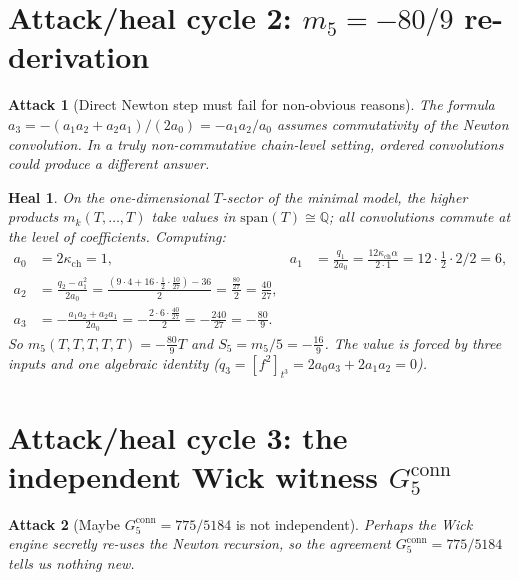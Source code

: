 \documentclass[11pt]{article}
\newtheorem{attack}{Attack}
\newtheorem*{heal}{Heal}
\newcommand{\kch}{\kappa_{\mathrm{ch}}}
\newcommand{\conn}{\mathrm{conn}}
\begin{document}
\section{Attack/heal cycle 2: $m_5=-80/9$ re-derivation}

\begin{attack}[Direct Newton step must fail for non-obvious reasons]
The formula $a_3=-(a_1a_2+a_2a_1)/(2a_0)=-a_1a_2/a_0$ assumes
commutativity of the Newton convolution. In a truly non-commutative
chain-level setting, ordered convolutions could produce a different
answer.
\end{attack}

\begin{heal}
On the one-dimensional $T$-sector of the minimal model, the
higher products $m_k(T,\ldots,T)$ take values in
$\mathrm{span}(T)\cong\mathbb{Q}$; all convolutions commute at the
level of coefficients. Computing:
\begin{align*}
a_0 &= 2\kch = 1,
&a_1&= \frac{q_1}{2a_0} = \frac{12\kch\alpha}{2\cdot 1}
     = 12\cdot\tfrac12\cdot 2 / 2 = 6,\\
a_2 &= \frac{q_2-a_1^2}{2a_0}
     = \frac{(9\cdot 4 + 16\cdot\tfrac12\cdot\tfrac{10}{27})-36}{2}
     = \frac{\tfrac{80}{27}}{2} = \tfrac{40}{27},\\
a_3 &= -\frac{a_1a_2+a_2a_1}{2a_0}
     = -\frac{2\cdot 6\cdot\tfrac{40}{27}}{2}
     = -\tfrac{240}{27} = -\tfrac{80}{9}.
\end{align*}
So $m_5(T,T,T,T,T)=-\tfrac{80}{9}T$ and $S_5=m_5/5=-\tfrac{16}{9}$.
The value is forced by three inputs and one algebraic identity
($q_3=[f^2]_{t^3}=2a_0a_3+2a_1a_2=0$).
\end{heal}

\section{Attack/heal cycle 3: the independent Wick witness $G_5^\conn$}

\begin{attack}[Maybe $G_5^\conn=775/5184$ is not independent]
Perhaps the Wick engine secretly re-uses the Newton recursion, so
the agreement $G_5^\conn=775/5184$ tells us nothing new.
\end{attack}
\end{document}
